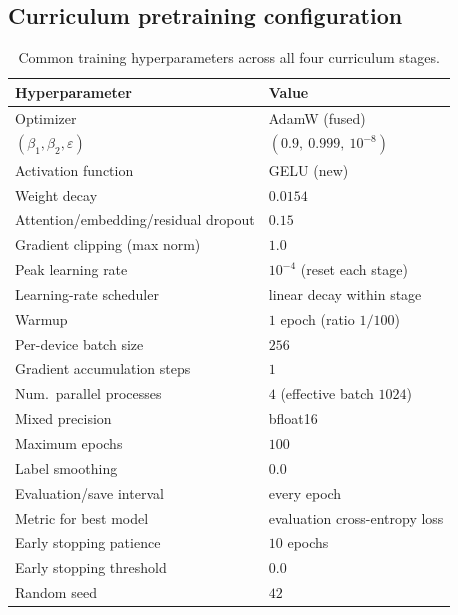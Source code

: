 \documentclass[titlepage,a4paper,11pt]{report}
\begin{document}
    \subsection{Curriculum pretraining configuration}
    
    \begin{table}[h!]
    \centering
    \caption{Common training hyperparameters across all four curriculum stages.}
    \label{tab:curriculum_hyperparams}
    \begin{tabular}{ll}
        \toprule
        \textbf{Hyperparameter} & \textbf{Value} \\
        \midrule
        Optimizer & AdamW (fused) \\
        \quad $(\beta_1, \beta_2, \varepsilon)$ & $(0.9,\ 0.999,\ 10^{-8})$ \\
        Activation function & GELU (new) \\
        Weight decay & $0.0154$ \\
        Attention/embedding/residual dropout & $0.15$ \\
        Gradient clipping (max norm) & $1.0$ \\
        Peak learning rate & $10^{-4}$ (reset each stage) \\
        Learning-rate scheduler & linear decay within stage \\
        Warmup & $1$ epoch (ratio $1/100$) \\
        Per-device batch size & $256$ \\
        Gradient accumulation steps & $1$ \\
        Num.\ parallel processes & $4$ (effective batch $1024$) \\
        Mixed precision & bfloat16 \\
        Maximum epochs & $100$ \\
        Label smoothing & $0.0$ \\
        Evaluation/save interval & every epoch \\
        Metric for best model & evaluation cross-entropy loss \\
        Early stopping patience & $10$ epochs \\
        Early stopping threshold & $0.0$ \\
        Random seed & $42$ \\
        \bottomrule
    \end{tabular}
    \end{table}
\end{document}
